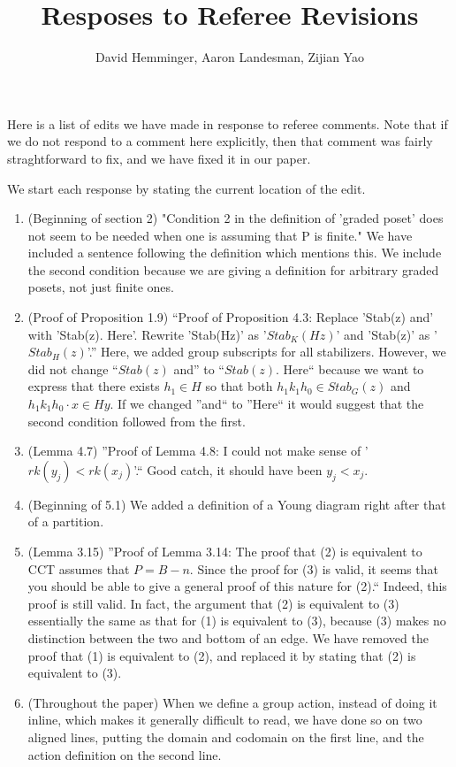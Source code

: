 \documentclass[10 pt]{amsart}
\title{Resposes to Referee Revisions}
\author{David Hemminger, Aaron Landesman, Zijian Yao}
\theoremstyle{plain}
\theoremstyle{definition}
\theoremstyle{remark}
\numberwithin{equation}{section}
\begin{document}
\maketitle

Here is a list of edits we have made in response to referee comments.
Note that if we do not respond to a comment here explicitly, then
that comment was fairly straghtforward to fix, and we have
fixed it in our paper.

We start each response by stating the current location of the edit.

\begin{enumerate}
	\item (Beginning of section 2) "Condition 2 in the definition of 'graded poset' does not seem to be needed when one is assuming that P is finite."
We have included a sentence
		following the definition which mentions this.
		We include the second condition because we are giving a definition for arbitrary graded
		posets, not just finite ones. 
	\item  (Proof of Proposition 1.9) ``Proof of Proposition 4.3:  Replace 'Stab(z) and' with 'Stab(z). Here'.  Rewrite 'Stab(Hz)' as '$Stab_K(Hz)$' and 'Stab(z)' as '$Stab_H(z)$'.''
		Here, we added group subscripts for all stabilizers.
		However, we did not change ``$Stab(z)$ and'' to ``$Stab(z)$. Here`` because we want to express that there exists $h_1 \in H$ so that both
		$h_1 k_1 h_0 \in Stab_G(z)$ and $h_1k_1h_0 \cdot x \in Hy$.
		If we changed ''and`` to ''Here`` it would suggest
		that the second condition followed from the first.
	\item (Lemma 4.7) ''Proof of Lemma 4.8:  I could not make sense of '$rk(y_j) < rk(x_j)$'.`` Good catch, it should have been $y_j < x_j$.
	\item (Beginning of 5.1) We added a definition of a Young diagram right after that of a partition.
	\item (Lemma 3.15) ''Proof of Lemma 3.14:  The proof that (2) is equivalent to CCT assumes that $P = B-n$.  Since the proof for (3) is valid, it seems that you should be able to give a general proof of this nature for (2).``
		Indeed, this proof is still valid. In fact, the argument that (2) is equivalent to (3) essentially the same as that for (1) is equivalent to (3), because (3) makes no distinction between the two and bottom of an edge. We have removed the proof that (1) is equivalent to (2), and replaced it by stating that (2) is equivalent to (3).
	\item (Throughout the paper) When we define a group action, instead of doing it inline, which makes it generally difficult to read, we have done so on two aligned lines, putting the domain and codomain on the first line, and the action definition on the second line.

\end{enumerate}
\end{document}
